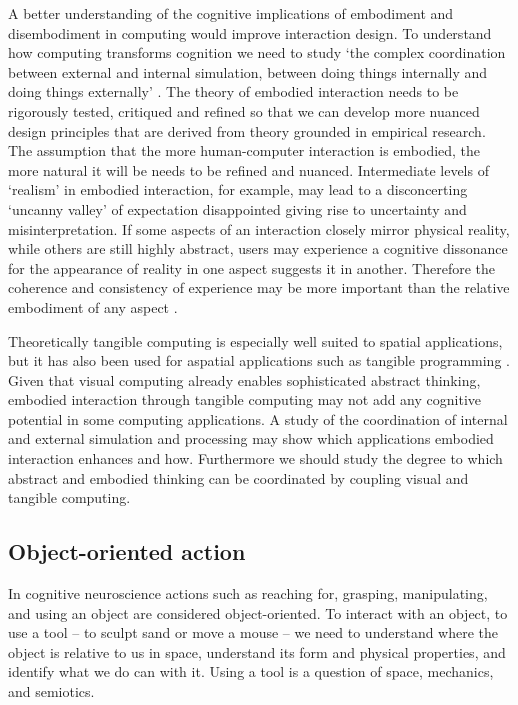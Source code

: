 \documentclass{article}
\begin{document}
A better understanding of the cognitive implications of embodiment and disembodiment in computing would improve interaction design. 
To understand how computing transforms cognition we need to study
`the complex coordination between external and internal simulation, between doing things internally and doing things externally' \citep{Kirsh2013}. 
The theory of embodied interaction needs to be rigorously tested, critiqued and refined so that 
we can develop more nuanced design principles that are derived from theory grounded in empirical research. 
The assumption that the more human-computer interaction is embodied, 
the more natural it will be needs to be refined and nuanced.  
Intermediate levels of `realism' in embodied interaction, for example, may lead to a disconcerting `uncanny valley' of expectation disappointed giving rise to uncertainty and misinterpretation. If some aspects of an interaction closely mirror physical reality, while others are still highly abstract, users may experience a cognitive dissonance for the appearance of reality in one aspect suggests it in another. Therefore the coherence and consistency of experience may be more important than the relative embodiment of any aspect
\citep{Cafaro2014}. 

Theoretically tangible computing is especially well suited to spatial applications, but it has also been used for aspatial applications such as tangible programming \citep{Horn2007}.
Given that visual computing already enables sophisticated abstract thinking, 
embodied interaction through tangible computing 
may not add any cognitive potential in some computing applications. 
A study of the coordination of internal and external simulation and processing 
may show which applications embodied interaction enhances and how. 
Furthermore we should study the degree to which abstract and embodied thinking can be coordinated by coupling visual and tangible computing. 

\subsection{Object-oriented action}

In cognitive neuroscience actions such as reaching for, grasping, manipulating, and using an object are considered object-oriented. 
To interact with an object, to use a tool -- to sculpt sand or move a mouse -- we need to understand where the object is relative to us in space, understand its form and physical properties, and identify what we do can with it. 
Using a tool is a question of space, mechanics, and semiotics. 
\end{document}
